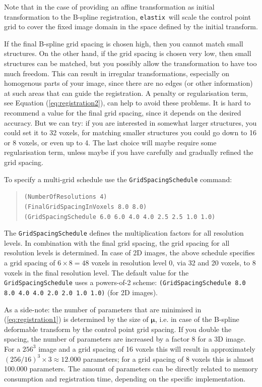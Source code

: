 \documentclass[]{report}
\newcommand{\elastix}{\texttt{elastix}}
\newcommand{\vmu}{\bm{\mu}}
\begin{document}
Note that in the case of providing an affine transformation as
initial transformation to the B-spline registration, \elastix\ will
scale the control point grid to cover the fixed image domain in the
space defined by the initial transform.

If the final B-spline grid spacing is chosen high, then you cannot
match small structures. On the other hand, if the grid spacing is
chosen very low, then small structures can be matched, but you
possibly allow the transformation to have too much freedom. This can
result in irregular transformations, especially on homogenous parts
of your image, since there are no edges (or other information) at
such areas that can guide the registration. A penalty or
regularisation term, see Equation (\ref{eq:registration2}), can help
to avoid these problems. It is hard to recommend a value for the
final grid spacing, since it depends on the desired accuracy. But we
can try: if you are interested in somewhat larger structures, you
could set it to 32 voxels, for matching smaller structures you could
go down to 16 or 8 voxels, or even up to 4. The last choice will
maybe require some regularisation term, unless maybe if you have
carefully and gradually refined the grid spacing.

To specify a multi-grid schedule use the \texttt{GridSpacingSchedule}
command:
\begin{quote}
\texttt{(NumberOfResolutions 4)} \\
\texttt{(FinalGridSpacingInVoxels 8.0 8.0)} \\
\texttt{(GridSpacingSchedule 6.0 6.0 4.0 4.0 2.5 2.5 1.0 1.0)}
\end{quote}
The \texttt{GridSpacingSchedule} defines the multiplication
factors for all resolution levels. In combination with the final
grid spacing, the grid spacing for all resolution levels is
determined. In case of 2D images, the above schedule specifies a
grid spacing of $6 \times 8 = 48$ voxels in resolution level 0,
via 32 and 20 voxels, to 8 voxels in the final resolution level.
The default value for the \texttt{GridSpacingSchedule} uses a
powers-of-2 scheme: \texttt{(GridSpacingSchedule 8.0 8.0 4.0 4.0
2.0 2.0 1.0 1.0)} (for 2D images).

As a side-note: the number of parameters that are minimised in
(\ref{eq:registration1}) is determined by the size of $\vmu$, i.e.
in case of the B-spline deformable transform by the control point
grid spacing. If you double the spacing, the number of parameters
are increased by a factor 8 for a 3D image. For a $256^3$ image and
a grid spacing of 16 voxels this will result in approximately
$(256/16)^3 \times 3 \approx 12.000$ parameters; for a grid spacing
of 8 voxels this is almost 100.000 parameters. The amount of
parameters can be directly related to memory consumption and
registration time, depending on the specific implementation.
\end{document}
